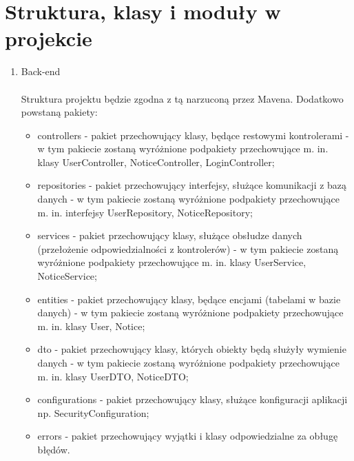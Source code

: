 \documentclass{article}
\begin{document}
\section{Struktura, klasy i moduły w projekcie}
{\fontsize{12}{12}\selectfont
    
\begin{enumerate}
    \item Back-end \\ \\
    Struktura projektu będzie zgodna z tą narzuconą przez Mavena. Dodatkowo powstaną pakiety:
    \begin{itemize}
        \item controllers - pakiet przechowujący klasy, będące restowymi kontrolerami - w tym pakiecie zostaną wyróżnione podpakiety przechowujące m. in. klasy UserController, NoticeController, LoginController;
        \item repositories - pakiet przechowujący interfejsy, służące komunikacji z bazą danych - w tym pakiecie zostaną wyróżnione podpakiety przechowujące m. in. interfejsy UserRepository, NoticeRepository;
        \item services - pakiet przechowujący klasy, służące obsłudze danych (przełożenie odpowiedzialności z kontrolerów) - w tym pakiecie zostaną wyróżnione podpakiety przechowujące m. in. klasy UserService, NoticeService;
        \item entities - pakiet przechowujący klasy, będące encjami (tabelami w bazie danych) - w tym pakiecie zostaną wyróżnione podpakiety przechowujące m. in. klasy User, Notice;
        \item dto - pakiet przechowujący klasy, których obiekty będą służyły wymienie danych - w tym pakiecie zostaną wyróżnione podpakiety przechowujące m. in. klasy UserDTO, NoticeDTO;
        \item configurations - pakiet przechowujący klasy, służące konfiguracji aplikacji np. SecurityConfiguration;
        \item errors - pakiet przechowujący wyjątki i klasy odpowiedzialne za obługę błędów.
        

\end{itemize}
\end{enumerate}}
\end{document}
